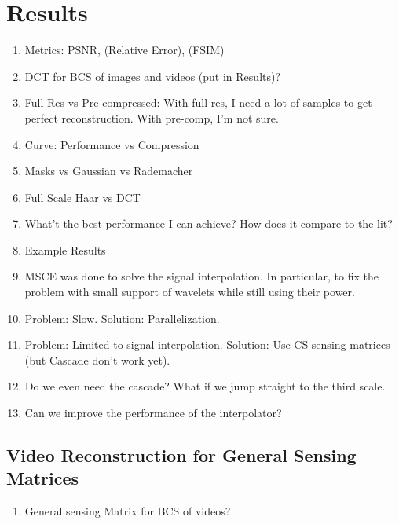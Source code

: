 \chapter{Results}
\label{ch:results}
\begin{enumerate}
\item Metrics: PSNR, (Relative Error), (FSIM)
\item DCT for BCS of images and videos (put in Results)?
\item Full Res vs Pre-compressed: With full res, I need a lot of samples to get perfect reconstruction. With pre-comp, I'm not sure.
\item Curve: Performance vs Compression
\item Masks vs Gaussian vs Rademacher
\item Full Scale Haar vs DCT
\item What't the best performance I can achieve? How does it compare to the lit?
\item Example Results
\item MSCE was done to solve the signal interpolation. In particular, to fix the problem with small support of wavelets while still using their power.
\item Problem: Slow. Solution: Parallelization.
\item Problem: Limited to signal interpolation. Solution: Use CS sensing matrices (but Cascade don't work yet).
\item Do we even need the cascade? What if we jump straight to the third scale.
\item Can we improve the performance of the interpolator? 
\end{enumerate}

\section{Video Reconstruction for General Sensing Matrices}
\begin{enumerate}
\item General sensing Matrix for BCS of videos?
\end{enumerate}
